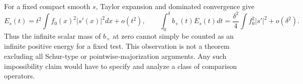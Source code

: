 \begin{remark}\label{rem:schur}
For a fixed compact smooth $s$, Taylor expansion and dominated
convergence give
\[
 E_s(t)=t^2\int f_0(x)^2|s'(x)|^2dx+o(t^2),\qquad
 \int_0^\delta b_+(t)E_s(t)dt
   =\frac{\delta^2}{4}\int f_0^2|s'|^2+o(\delta^2).
\]
Thus the infinite scalar mass of $b_+$ at zero cannot simply be
counted as an infinite positive energy for a fixed test. This
observation is not a theorem excluding all Schur-type or
pointwise-majorization arguments. Any such impossibility claim would
have to specify and analyze a class of comparison operators.
\end{remark}

